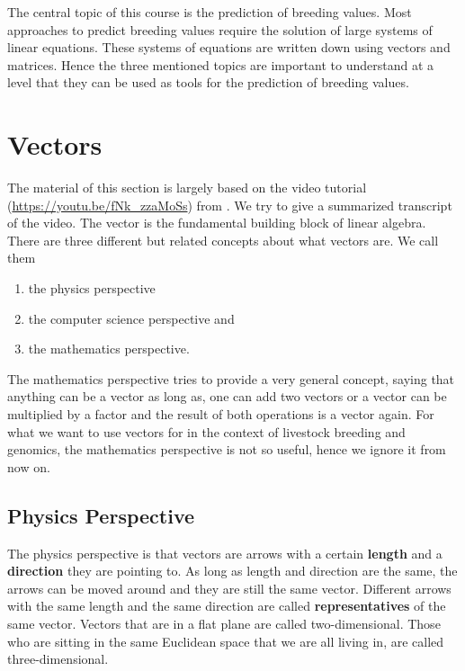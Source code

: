 \documentclass[
]{book}
\providecommand{\tightlist}{%
  \setlength{\itemsep}{0pt}\setlength{\parskip}{0pt}}
\begin{document}
The central topic of this course is the prediction of breeding values. Most approaches to predict breeding values require the solution of large systems of linear equations. These systems of equations are written down using vectors and matrices. Hence the three mentioned topics are important to understand at a level that they can be used as tools for the prediction of breeding values.

\hypertarget{intro-linalg-vectors}{%
\section{Vectors}\label{intro-linalg-vectors}}

The material of this section is largely based on the video tutorial (\url{https://youtu.be/fNk_zzaMoSs}) from \citep{3Blue1Brown2016a}. We try to give a summarized transcript of the video. The vector is the fundamental building block of linear algebra. There are three different but related concepts about what vectors are. We call them

\begin{enumerate}
\def\labelenumi{\arabic{enumi}.}
\tightlist
\item
  the physics perspective
\item
  the computer science perspective and
\item
  the mathematics perspective.
\end{enumerate}

The mathematics perspective tries to provide a very general concept, saying that anything can be a vector as long as, one can add two vectors or a vector can be multiplied by a factor and the result of both operations is a vector again. For what we want to use vectors for in the context of livestock breeding and genomics, the mathematics perspective is not so useful, hence we ignore it from now on.

\hypertarget{intro-linalg-physics-perspective}{%
\subsection{Physics Perspective}\label{intro-linalg-physics-perspective}}

The physics perspective is that vectors are arrows with a certain \textbf{length} and a \textbf{direction} they are pointing to. As long as length and direction are the same, the arrows can be moved around and they are still the same vector. Different arrows with the same length and the same direction are called \textbf{representatives} of the same vector. Vectors that are in a flat plane are called two-dimensional. Those who are sitting in the same Euclidean space that we are all living in, are called three-dimensional.
\end{document}
